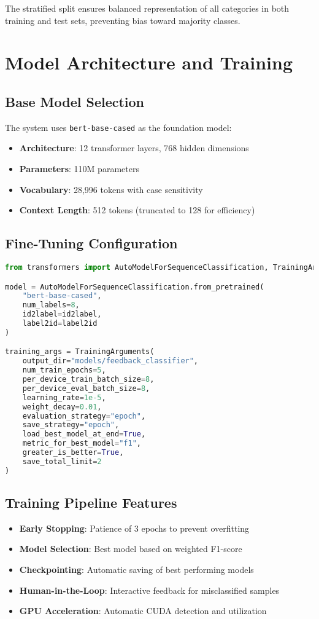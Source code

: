 \documentclass[11pt,a4paper]{article}
\begin{document}
The stratified split ensures balanced representation of all categories in both training and test sets, preventing bias toward majority classes.

\section{Model Architecture and Training}

\subsection{Base Model Selection}
The system uses \texttt{bert-base-cased} as the foundation model:
\begin{itemize}
  \item \textbf{Architecture}: 12 transformer layers, 768 hidden dimensions
  \item \textbf{Parameters}: 110M parameters
  \item \textbf{Vocabulary}: 28,996 tokens with case sensitivity
  \item \textbf{Context Length}: 512 tokens (truncated to 128 for efficiency)
\end{itemize}

\subsection{Fine-Tuning Configuration}
\begin{lstlisting}[style=code,language=Python]
from transformers import AutoModelForSequenceClassification, TrainingArguments

model = AutoModelForSequenceClassification.from_pretrained(
    "bert-base-cased", 
    num_labels=8, 
    id2label=id2label, 
    label2id=label2id
)

training_args = TrainingArguments(
    output_dir="models/feedback_classifier",
    num_train_epochs=5,
    per_device_train_batch_size=8,
    per_device_eval_batch_size=8,
    learning_rate=1e-5,
    weight_decay=0.01,
    evaluation_strategy="epoch",
    save_strategy="epoch",
    load_best_model_at_end=True,
    metric_for_best_model="f1",
    greater_is_better=True,
    save_total_limit=2
)
\end{lstlisting}

\subsection{Training Pipeline Features}
\begin{itemize}
  \item \textbf{Early Stopping}: Patience of 3 epochs to prevent overfitting
  \item \textbf{Model Selection}: Best model based on weighted F1-score
  \item \textbf{Checkpointing}: Automatic saving of best performing models
  \item \textbf{Human-in-the-Loop}: Interactive feedback for misclassified samples
  \item \textbf{GPU Acceleration}: Automatic CUDA detection and utilization
\end{itemize}
\end{document}

